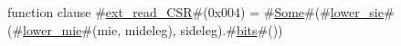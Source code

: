 function clause #\hyperref[sailRISCVzextzyreadzyCSR]{ext\_read\_CSR}#(0x004) = #\hyperref[sailRISCVzSome]{Some}#(#\hyperref[sailRISCVzlowerzysie]{lower\_sie}#(#\hyperref[sailRISCVzlowerzymie]{lower\_mie}#(mie, mideleg), sideleg).#\hyperref[sailRISCVzbits]{bits}#())

